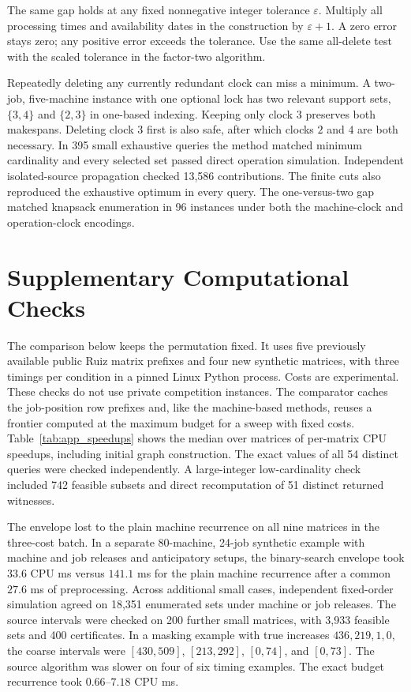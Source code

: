 \documentclass[11pt,letterpaper]{article}
\begin{document}
The same gap holds at any fixed nonnegative integer tolerance $\varepsilon$. Multiply all processing times and availability dates in the construction by $\varepsilon+1$. A zero error stays zero; any positive error exceeds the tolerance. Use the same all-delete test with the scaled tolerance in the factor-two algorithm.

Repeatedly deleting any currently redundant clock can miss a minimum. A two-job, five-machine instance with one optional lock has two relevant support sets, $\{3,4\}$ and $\{2,3\}$ in one-based indexing. Keeping only clock $3$ preserves both makespans. Deleting clock $3$ first is also safe, after which clocks $2$ and $4$ are both necessary. In 395 small exhaustive queries the method matched minimum cardinality and every selected set passed direct operation simulation. Independent isolated-source propagation checked 13,586 contributions. The finite cuts also reproduced the exhaustive optimum in every query. The one-versus-two gap matched knapsack enumeration in 96 instances under both the machine-clock and operation-clock encodings.

\section{Supplementary Computational Checks}
\label{app:comp}

The comparison below keeps the permutation fixed. It uses five previously available public Ruiz matrix prefixes and four new synthetic matrices, with three timings per condition in a pinned Linux Python process. Costs are experimental. These checks do not use private competition instances. The comparator caches the job-position row prefixes and, like the machine-based methods, reuses a frontier computed at the maximum budget for a sweep with fixed costs. Table~\ref{tab:app_speedups} shows the median over matrices of per-matrix CPU speedups, including initial graph construction. The exact values of all 54 distinct queries were checked independently. A large-integer low-cardinality check included 742 feasible subsets and direct recomputation of 51 distinct returned witnesses.


The envelope lost to the plain machine recurrence on all nine matrices in the three-cost batch. In a separate 80-machine, 24-job synthetic example with machine and job releases and anticipatory setups, the binary-search envelope took $33.6$ CPU ms versus $141.1$ ms for the plain machine recurrence after a common $27.6$ ms of preprocessing. Across additional small cases, independent fixed-order simulation agreed on 18,351 enumerated sets under machine or job releases. The source intervals were checked on 200 further small matrices, with 3,933 feasible sets and 400 certificates. In a masking example with true increases $436,219,1,0$, the coarse intervals were $[430,509]$, $[213,292]$, $[0,74]$, and $[0,73]$. The source algorithm was slower on four of six timing examples. The exact budget recurrence took $0.66$--$7.18$ CPU ms.
\end{document}
